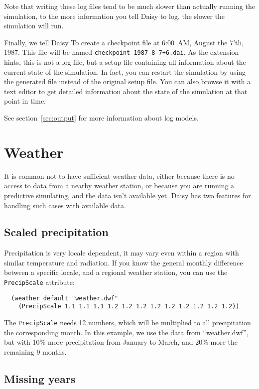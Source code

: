 \documentclass[a4paper]{article}
\begin{document}
Note that writing these log files tend to be much slower than actually
running the simulation, to the more information you tell Daisy to
log, the slower the simulation will run.

Finally, we tell Daisy To create a checkpoint file at 6:00~AM,
August the 7'th, 1987.  This file will be named
\texttt{checkpoint-1987-8-7+6.dai}.  As the extension hints, this is
not a log file, but a setup file containing all information about the
current state of the simulation.  In fact, you can restart the
simulation by using the generated file instead of the original setup
file.  You can also browse it with a text editor to get detailed
information about the state of the simulation at that point in time.

See section~\ref{sec:output} for more information about log models.

\section{Weather}
\label{sec:weather}

It is common not to have sufficient weather data, either because there
is no access to data from a nearby weather station, or because you are
running a predictive simulating, and the data isn't available yet.
Daisy has two features for handling such cases with available
data.  

\subsection{Scaled precipitation}

Precipitation is very locale dependent, it may vary even within a
region with similar temperature and radiation.  If you know the
general monthly difference between a specific locale, and a regional
weather station, you can use the \texttt{PrecipScale} attribute:
\begin{verbatim}
  (weather default "weather.dwf"
    (PrecipScale 1.1 1.1 1.1 1.2 1.2 1.2 1.2 1.2 1.2 1.2 1.2 1.2))
\end{verbatim}
The \texttt{PrecipScale} needs 12 numbers, which will be multiplied to
all precipitation the corresponding month.  In this example, we use
the data from ``weather.dwf'', but with 10\% more precipitation from
January to March, and 20\% more the remaining 9 months.

\subsection{Missing years}
\end{document}
